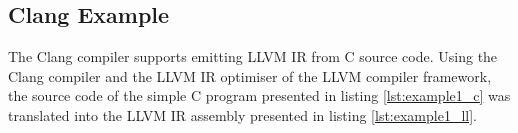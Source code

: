 
\subsection{Clang Example}
\label{app:clang_example}

The Clang compiler supports emitting LLVM IR from C source code. Using the Clang compiler and the LLVM IR optimiser of the LLVM compiler framework, the source code of the simple C program presented in listing \ref{lst:example1_c} was translated into the LLVM IR assembly presented in listing \ref{lst:example1_ll}.




